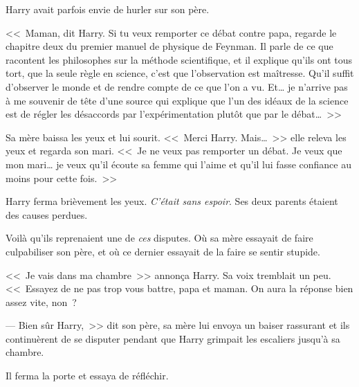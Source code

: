 Harry avait parfois envie de hurler sur son père.

<<~Maman, dit Harry. Si tu veux remporter ce débat contre papa, regarde le chapitre deux du premier manuel de physique de Feynman. Il parle de ce que racontent les philosophes sur la méthode scientifique, et il explique qu'ils ont tous tort, que la seule règle en science, c'est que l'observation est maîtresse. Qu'il suffit d'observer le monde et de rendre compte de ce que l'on a vu. Et… je n'arrive pas à me souvenir de tête d'une source qui explique que l'un des idéaux de la science est de régler les désaccords par l'expérimentation plutôt que par le débat…~>>

Sa mère baissa les yeux et lui sourit. <<~Merci Harry. Mais…~>> elle releva les yeux et regarda son mari. <<~Je ne veux pas remporter un débat. Je veux que mon mari… je veux qu'il écoute sa femme qui l'aime et qu'il lui fasse confiance au moins pour cette fois.~>>

Harry ferma brièvement les yeux. \emph{C'était sans espoir}. Ses deux parents étaient des causes perdues.

Voilà qu'ils reprenaient une de \emph{ces} disputes. Où sa mère essayait de faire culpabiliser son père, et où ce dernier essayait de la faire se
sentir stupide.

<<~Je vais dans ma chambre~>> annonça Harry. Sa voix tremblait un peu. <<~Essayez de ne pas trop vous battre, papa et maman. On aura la réponse bien assez vite, non~?

--- Bien sûr Harry,~>> dit son père, sa mère lui envoya un baiser rassurant et ils continuèrent de se disputer pendant que Harry grimpait les escaliers jusqu'à sa chambre.

Il ferma la porte et essaya de réfléchir.


